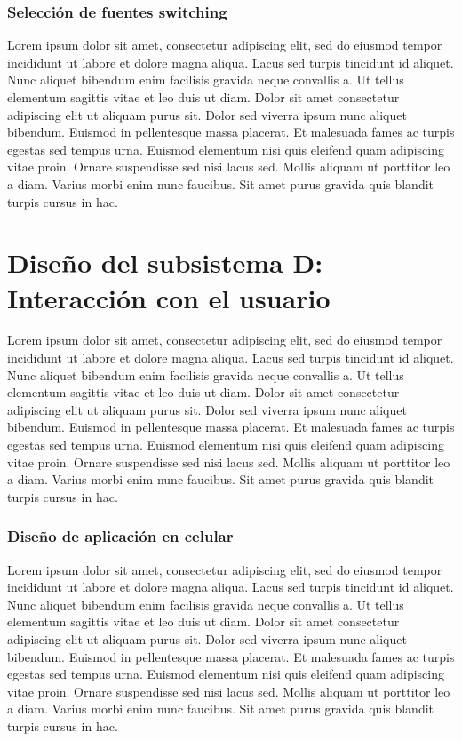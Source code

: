 \subsubsection{Selección de fuentes switching} %

Lorem ipsum dolor sit amet, consectetur adipiscing elit, sed do eiusmod tempor incididunt ut labore et dolore magna aliqua. Lacus sed turpis tincidunt id aliquet. Nunc aliquet bibendum enim facilisis gravida neque convallis a. Ut tellus elementum sagittis vitae et leo duis ut diam. Dolor sit amet consectetur adipiscing elit ut aliquam purus sit. Dolor sed viverra ipsum nunc aliquet bibendum. Euismod in pellentesque massa placerat. Et malesuada fames ac turpis egestas sed tempus urna. Euismod elementum nisi quis eleifend quam adipiscing vitae proin. Ornare suspendisse sed nisi lacus sed. Mollis aliquam ut porttitor leo a diam. Varius morbi enim nunc faucibus. Sit amet purus gravida quis blandit turpis cursus in hac.

\section{Diseño del subsistema D: Interacción con el usuario}

Lorem ipsum dolor sit amet, consectetur adipiscing elit, sed do eiusmod tempor incididunt ut labore et dolore magna aliqua. Lacus sed turpis tincidunt id aliquet. Nunc aliquet bibendum enim facilisis gravida neque convallis a. Ut tellus elementum sagittis vitae et leo duis ut diam. Dolor sit amet consectetur adipiscing elit ut aliquam purus sit. Dolor sed viverra ipsum nunc aliquet bibendum. Euismod in pellentesque massa placerat. Et malesuada fames ac turpis egestas sed tempus urna. Euismod elementum nisi quis eleifend quam adipiscing vitae proin. Ornare suspendisse sed nisi lacus sed. Mollis aliquam ut porttitor leo a diam. Varius morbi enim nunc faucibus. Sit amet purus gravida quis blandit turpis cursus in hac.

\subsubsection{Diseño de aplicación en celular} %

Lorem ipsum dolor sit amet, consectetur adipiscing elit, sed do eiusmod tempor incididunt ut labore et dolore magna aliqua. Lacus sed turpis tincidunt id aliquet. Nunc aliquet bibendum enim facilisis gravida neque convallis a. Ut tellus elementum sagittis vitae et leo duis ut diam. Dolor sit amet consectetur adipiscing elit ut aliquam purus sit. Dolor sed viverra ipsum nunc aliquet bibendum. Euismod in pellentesque massa placerat. Et malesuada fames ac turpis egestas sed tempus urna. Euismod elementum nisi quis eleifend quam adipiscing vitae proin. Ornare suspendisse sed nisi lacus sed. Mollis aliquam ut porttitor leo a diam. Varius morbi enim nunc faucibus. Sit amet purus gravida quis blandit turpis cursus in hac.


